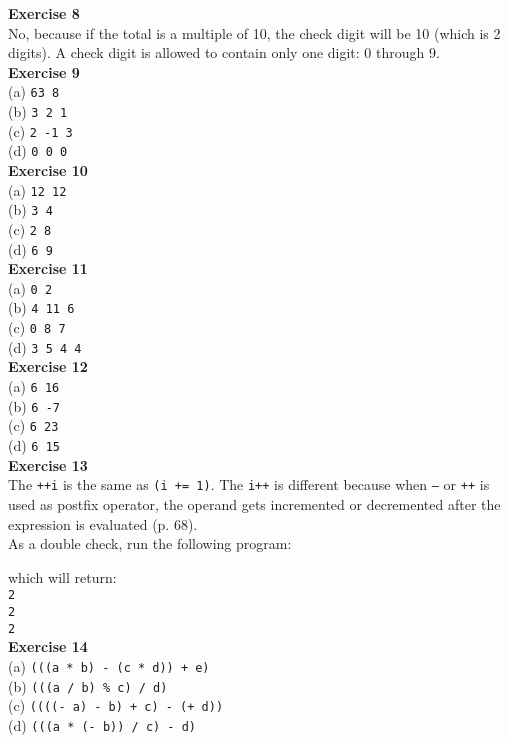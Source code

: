 \documentclass[a4paper, 10pt]{article}
\begin{document}
\textbf{Exercise 8} \\
No, because if the total is a multiple of 10, the check digit will be 10 (which is 2 digits). A check digit is allowed to contain only one digit: 0 through 9.\\

\textbf{Exercise 9} \\
(a) \texttt{63 8} \\
(b) \texttt{3 2 1} \\
(c) \texttt{2 -1 3} \\
(d) \texttt{0 0 0} \\

\textbf{Exercise 10} \\
(a) \texttt{12 12} \\
(b) \texttt{3 4} \\
(c) \texttt{2 8} \\
(d) \texttt{6 9} \\

\textbf{Exercise 11} \\
(a) \texttt{0 2} \\
(b) \texttt{4 11 6} \\
(c) \texttt{0 8 7} \\
(d) \texttt{3 5 4 4} \\

\textbf{Exercise 12} \\
(a) \texttt{6 16} \\
(b) \texttt{6 -7} \\
(c) \texttt{6 23} \\
(d) \texttt{6 15} \\ 

\textbf{Exercise 13} \\
The \texttt{++i} is the same as \texttt{(i += 1)}. The \texttt{i++} is different because when \texttt{--} or \texttt{++} is used as postfix operator, the operand gets incremented or decremented after the expression is evaluated (p. 68). \\

As a double check, run the following program:

which will return: \\
\texttt{2 \\ 2 \\ 2} \\

\textbf{Exercise 14} \\
(a) \texttt{(((a * b) - (c * d)) + e)} \\
(b) \texttt{(((a / b) \% c) / d)} \\
(c) \texttt{((((- a) - b) + c) - (+ d))} \\
(d) \texttt{(((a * (- b)) / c) - d)} \\
\end{document}
